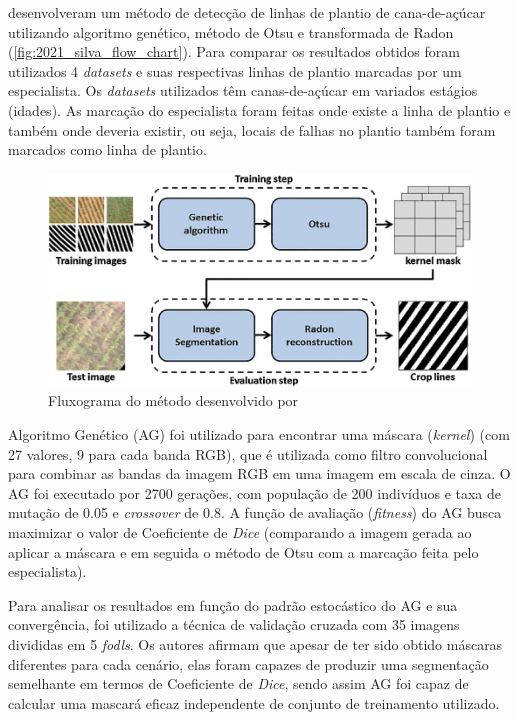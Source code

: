 \documentclass[12pt, a4paper, english, brazil]{article}
\begin{document}
 desenvolveram um método de detecção de linhas de plantio de cana-de-açúcar utilizando algoritmo genético, método de Otsu e transformada de Radon (\autoref{fig:2021_silva_flow_chart}). Para comparar os resultados obtidos foram utilizados 4 \textit{datasets} e suas respectivas linhas de plantio marcadas por um especialista. Os \textit{datasets} utilizados têm canas-de-açúcar em variados estágios (idades). As marcação do especialista foram feitas onde existe a linha de plantio e também onde deveria existir, ou seja, locais de falhas no plantio também foram marcados como linha de plantio.

\begin{figure}[htbp]
    \centering
    \includegraphics[width=0.6\textheight]{img/2021_Silva_flow_chart.png}
    \caption{Fluxograma do método desenvolvido por  }
    \label{fig:2021_silva_flow_chart}
\end{figure}

Algoritmo Genético (AG) foi utilizado para encontrar uma máscara (\textit{kernel}) (com 27 valores, 9 para cada banda RGB), que é utilizada como filtro convolucional para combinar as bandas da imagem RGB em uma imagem em escala de cinza. O AG foi executado por 2700 gerações, com população de 200 indivíduos e taxa de mutação de 0.05 e \textit{crossover} de 0.8. A função de avaliação (\textit{fitness}) do AG busca maximizar o valor de Coeficiente de \textit{Dice} (comparando a imagem gerada ao aplicar a máscara e em seguida o método de Otsu com a marcação feita pelo especialista).

Para analisar os resultados em função do padrão estocástico do AG e sua convergência, foi utilizado a técnica de validação cruzada com 35 imagens divididas em 5 \textit{fodls}. Os autores afirmam que apesar de ter sido obtido máscaras diferentes para cada cenário, elas foram capazes de produzir uma segmentação semelhante em termos de Coeficiente de \textit{Dice}, sendo assim AG foi capaz de calcular uma mascará eficaz independente de conjunto de treinamento utilizado.
\end{document}
